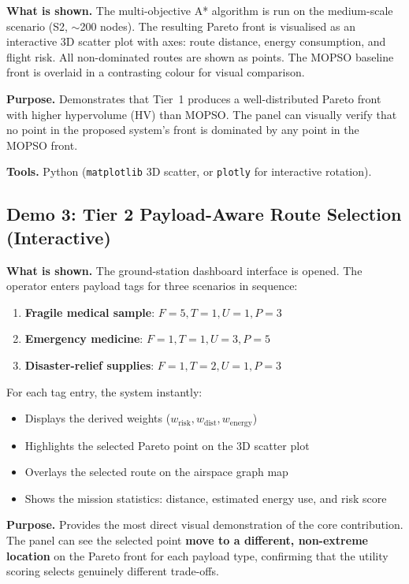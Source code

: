 \textbf{What is shown.} The multi-objective A* algorithm is run on the medium-scale
scenario (S2, $\sim$200 nodes). The resulting Pareto front is visualised as an
interactive 3D scatter plot with axes: route distance, energy consumption, and flight
risk. All non-dominated routes are shown as points. The MOPSO baseline front is overlaid
in a contrasting colour for visual comparison.

\textbf{Purpose.} Demonstrates that Tier~1 produces a well-distributed Pareto front with
higher hypervolume (HV) than MOPSO. The panel can visually verify that no point in the
proposed system's front is dominated by any point in the MOPSO front.

\textbf{Tools.} Python (\texttt{matplotlib} 3D scatter, or \texttt{plotly} for
interactive rotation).

\subsection{Demo 3: Tier 2 Payload-Aware Route Selection (Interactive)}

\textbf{What is shown.} The ground-station dashboard interface is opened. The operator
enters payload tags for three scenarios in sequence:

\begin{enumerate}
  \item \textbf{Fragile medical sample}: $F=5, T=1, U=1, P=3$
  \item \textbf{Emergency medicine}: $F=1, T=1, U=3, P=5$
  \item \textbf{Disaster-relief supplies}: $F=1, T=2, U=1, P=3$
\end{enumerate}

For each tag entry, the system instantly:
\begin{itemize}
  \item Displays the derived weights ($w_{\mathrm{risk}}, w_{\mathrm{dist}}, w_{\mathrm{energy}}$)
  \item Highlights the selected Pareto point on the 3D scatter plot
  \item Overlays the selected route on the airspace graph map
  \item Shows the mission statistics: distance, estimated energy use, and risk score
\end{itemize}

\textbf{Purpose.} Provides the most direct visual demonstration of the core contribution.
The panel can see the selected point \textbf{move to a different, non-extreme location}
on the Pareto front for each payload type, confirming that the utility scoring selects
genuinely different trade-offs.

